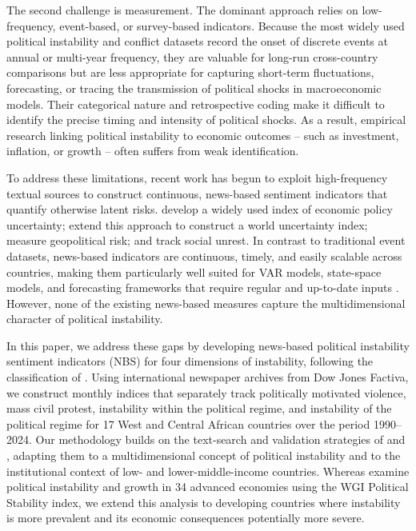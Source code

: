 \documentclass[12pt,a4paper,fleqn]{article}
\begin{document}
The second challenge is measurement. The dominant approach relies on low-frequency, event-based, or survey-based indicators. Because the most widely used political instability and conflict datasets record the onset of discrete events at annual or multi-year frequency, they are valuable for long-run cross-country comparisons but are less appropriate for capturing short-term fluctuations, forecasting, or tracing the transmission of political shocks in macroeconomic models. Their categorical nature and retrospective coding make it difficult to identify the precise timing and intensity of political shocks. As a result, empirical research linking political instability to economic outcomes -- such as investment, inflation, or growth -- often suffers from weak identification.

To address these limitations, recent work has begun to exploit high-frequency textual sources to construct continuous, news-based sentiment indicators that quantify otherwise latent risks. \cite{baker2016} develop a widely used index of economic policy uncertainty; \cite{AHIR2022} extend this approach to construct a world uncertainty index; \cite{caldara2022} measure geopolitical risk; and \cite{BARRETT2022} track social unrest. In contrast to traditional event datasets, news-based indicators are continuous, timely, and easily scalable across countries, making them particularly well suited for VAR models, state-space models, and forecasting frameworks that require regular and up-to-date inputs \citep{shapiro2022, ahir2023financial, APRIGLIANO2023791, fraiberger2021media, HUANG2019}. However, none of the existing news-based measures capture the multidimensional character of political instability.

In this paper, we address these gaps by developing news-based political instability sentiment indicators (NBS) for four dimensions of instability, following the classification of \cite{JONGAPIN2009}. Using international newspaper archives from Dow Jones Factiva, we construct monthly indices that separately track politically motivated violence, mass civil protest, instability within the political regime, and instability of the political regime for 17 West and Central African countries over the period 1990--2024. Our methodology builds on the text-search and validation strategies of \cite{caldara2022} and \cite{BARRETT2022}, adapting them to a multidimensional concept of political instability and to the institutional context of low- and lower-middle-income countries. Whereas \cite{DIRKS2024102586} examine political instability and growth in 34 advanced economies using the WGI Political Stability index, we extend this analysis to developing countries where instability is more prevalent and its economic consequences potentially more severe.
\end{document}
